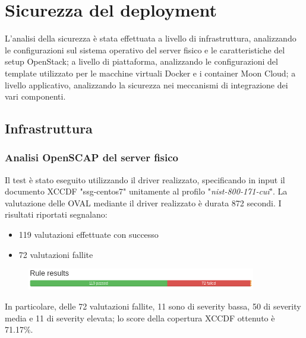 \documentclass[../main.tex]{subfiles}
\begin{document}
\section{Sicurezza del deployment}
L'analisi della sicurezza è stata effettuata a livello di infrastruttura, analizzando le configurazioni sul sistema operativo del server fisico e le caratteristiche del setup OpenStack; a livello di piattaforma, analizzando le configurazioni del template utilizzato per le macchine virtuali Docker e i container Moon Cloud; a livello applicativo, analizzando la sicurezza nei meccanismi di integrazione dei vari componenti.
\subsection{Infrastruttura}
\subsubsection{Analisi OpenSCAP del server fisico}

Il test è stato eseguito utilizzando il driver realizzato, specificando in input il documento XCCDF "ssg-centos7" unitamente al profilo "\textit{nist-800-171-cui}".
La valutazione delle OVAL mediante il driver realizzato è durata 872 secondi.
I risultati riportati segnalano:
\begin{itemize}
    \item 119 valutazioni effettuate con successo
    \item 72 valutazioni fallite
\end{itemize}
\begin{figure}[H]
    \includegraphics[width=10cm]{immagini/test_oscap_1.png}
\end{figure}

In particolare, delle 72 valutazioni fallite, 11 sono di severity bassa, 50 di severity media e 11 di severity elevata; lo score della copertura XCCDF ottenuto è 71.17\%.
\end{document}
